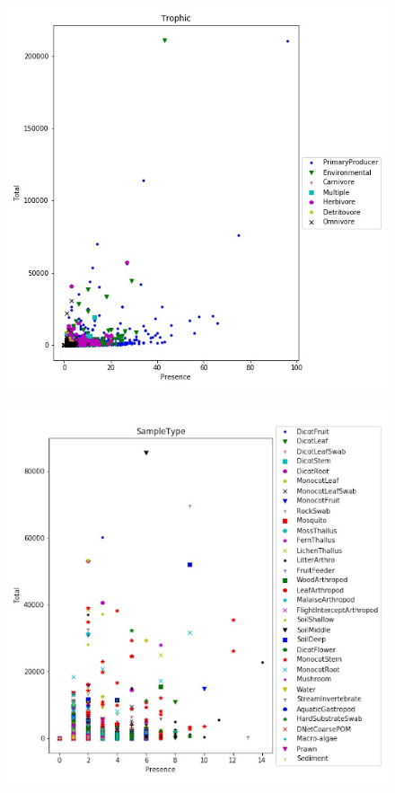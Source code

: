 \documentclass{article}
\theoremstyle{definition} \newtheorem*{lte}{Definition}
\theoremstyle{plain} \newtheorem*{csbt}{Theorem}
\begin{document}
\begin{figure}[H]
\begin{subfloat}{
  \includegraphics[width=.45\linewidth]{trophiccomp.png}
  \label{fig:trophiccomp}}
\end{subfloat}
\hspace{.1cm}
\begin{subfloat}{
  \includegraphics[width=.45\linewidth]{sampleTypecomp.png}
  \label{fig:sampletypecomp}}
  \end{subfloat}
\caption{}
\end{figure}
\end{document}
